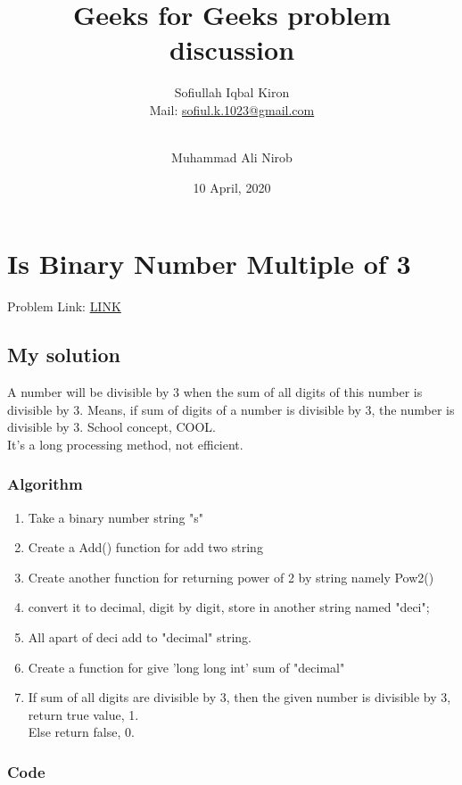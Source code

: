 \documentclass[11 pt]{article}
\title{Geeks for Geeks problem discussion}
\author[1]
{
 Sofiullah Iqbal Kiron\\
 Mail: \href{mailto:sofiul.k.1023@gmail.com}{sofiul.k.1023@gmail.com}
}
\author[2]{\\Muhammad Ali Nirob}
\affil[1]{BSMRSTU, Department of CSE}
\affil[2]{Markazul Suffah, Madani}
\date{10 April, 2020}
\begin{document}
\pagecolor{gray}
\maketitle
\pagebreak
\pagecolor{white}
\tableofcontents

\section{Is Binary Number Multiple of 3}
Problem Link: \href{https://practice.geeksforgeeks.org/problems/is-binary-number-multiple-of-3/0/#comment-4557555035}{LINK}

\subsection{My solution}
A number will be divisible by 3 when the sum of all digits of this number is divisible by 3. Means, if sum of digits of a number is divisible by 3, the number is divisible by 3. School concept, COOL.
\\
It's a long processing method, not efficient.

\subsubsection{Algorithm}

\begin{tcolorbox}
\begin{enumerate}

\item Take a binary number string "s"
\item Create a Add() function for add two string
\item Create another function for returning power of 2 by string namely Pow2()
\item convert it to decimal, digit by digit, store in another string named "deci";
\item All apart of deci add to "decimal" string.
\item Create a function for give 'long long int' sum of "decimal"
\item If sum of all digits are divisible by 3, then the given number is divisible by 3, return true value, 1.\\Else return false, 0.

\end{enumerate}
\end{tcolorbox}

\subsubsection{Code}
\end{document}
